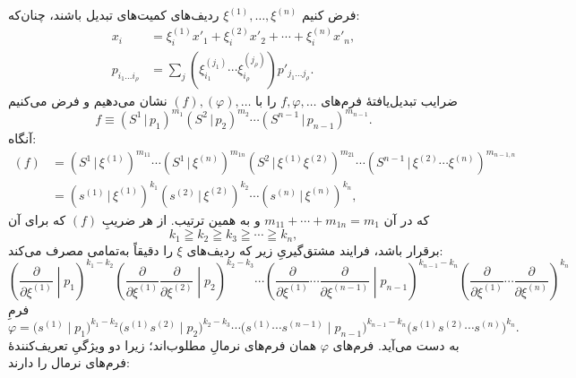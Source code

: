 \documentclass[11pt]{article}
\providecommand{\pair}[2]{(#1\,|\,#2)}
\begin{document}
فرض کنیم $\xi^{(1)},\ldots,\xi^{(n)}$ ردیف‌های کمیت‌های تبدیل باشند، چنان‌که:
\begin{equation}
\begin{aligned}
x_i&=\xi_i^{(1)}x'_1+\xi_i^{(2)}x'_2+\cdots+\xi_i^{(n)}x'_n,\\
p_{i_1\ldots i_\rho}&=\sum_j(\xi_{i_1}^{(j_1)}\cdots \xi_{i_\rho}^{(j_\rho)})p'_{j_1\ldots j_\rho}.
\end{aligned}
\tag{47}
\end{equation}
ضرایب تبدیل‌یافتهٔ فرم‌های $f,\varphi,\ldots$ را با $(f),(\varphi),\ldots$ نشان می‌دهیم و فرض می‌کنیم
\[
 f\equiv\pair{S^1}{p_1}^{m_1}\pair{S^2}{p_2}^{m_2}\cdots\pair{S^{n-1}}{p_{n-1}}^{m_{n-1}}.
\]
آنگاه:
\begin{equation}
\begin{aligned}
(f)&=\pair{S^1}{\xi^{(1)}}^{m_{11}}\cdots\pair{S^1}{\xi^{(n)}}^{m_{1n}}
\pair{S^2}{\xi^{(1)}\xi^{(2)}}^{m_{21}}\cdots
\pair{S^{n-1}}{\xi^{(2)}\cdots\xi^{(n)}}^{m_{n-1,n}}\\
&=\pair{s^{(1)}}{\xi^{(1)}}^{k_1}\pair{s^{(2)}}{\xi^{(2)}}^{k_2}\cdots\pair{s^{(n)}}{\xi^{(n)}}^{k_n},
\end{aligned}
\tag{48}
\end{equation}
که در آن $m_{11}+\cdots+m_{1n}=m_1$ و به همین ترتیب. از هر ضریبِ $(f)$ که برای آن
\begin{equation}
 k_1\geqq k_2\geqq k_3\geqq\cdots\geqq k_n,
\tag{49}
\end{equation}
برقرار باشد، فرایند مشتق‌گیریِ زیر که ردیف‌های $\xi$ را دقیقاً به‌تمامی مصرف می‌کند:
\begin{equation}
\left(\frac{\partial}{\partial\xi^{(1)}}\middle|p_1\right)^{k_1-k_2}
\left(\frac{\partial}{\partial\xi^{(1)}}\frac{\partial}{\partial\xi^{(2)}}\middle|p_2\right)^{k_2-k_3}
\cdots
\left(\frac{\partial}{\partial\xi^{(1)}}\cdots\frac{\partial}{\partial\xi^{(n-1)}}\middle|p_{n-1}\right)^{k_{n-1}-k_n}
\left(\frac{\partial}{\partial\xi^{(1)}}\cdots\frac{\partial}{\partial\xi^{(n)}}\right)^{k_n}
\tag{50}
\end{equation}
فرمِ
\begin{equation}
 \varphi=\bigl(s^{(1)}\mid p_1\bigr)^{k_1-k_2}
 \bigl(s^{(1)}s^{(2)}\mid p_2\bigr)^{k_2-k_3}\cdots
 \bigl(s^{(1)}\cdots s^{(n-1)}\mid p_{n-1}\bigr)^{k_{n-1}-k_n}
 \bigl(s^{(1)}s^{(2)}\cdots s^{(n)}\bigr)^{k_n}.
\tag{51}
\end{equation}
به دست می‌آید. فرم‌های $\varphi$ همان فرم‌های نرمالِ مطلوب‌اند؛ زیرا دو ویژگیِ تعریف‌کنندهٔ فرم‌های نرمال را دارند:
\end{document}
